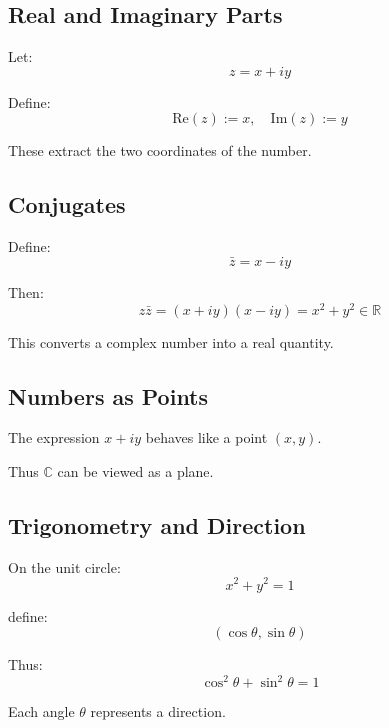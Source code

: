 \documentclass[11pt]{article}
\newcommand{\R}{\mathbb{R}}
\newcommand{\C}{\mathbb{C}}
\begin{document}
\subsection*{Real and Imaginary Parts}

Let:
\[
z = x + iy
\]

Define:
\[
\text{Re}(z) := x, \quad \text{Im}(z) := y
\]

These extract the two coordinates of the number.

\subsection*{Conjugates}

Define:
\[
\bar{z} = x - iy
\]

Then:
\[
z\bar{z} = (x+iy)(x-iy) = x^2 + y^2 \in \R
\]

This converts a complex number into a real quantity.

\subsection*{Numbers as Points}

The expression $x + iy$ behaves like a point $(x,y)$.

Thus $\C$ can be viewed as a plane.

\subsection*{Trigonometry and Direction}

On the unit circle:
\[
x^2 + y^2 = 1
\]

define:
\[
(\cos\theta, \sin\theta)
\]

Thus:
\[
\cos^2\theta + \sin^2\theta = 1
\]

Each angle $\theta$ represents a direction.
\end{document}
